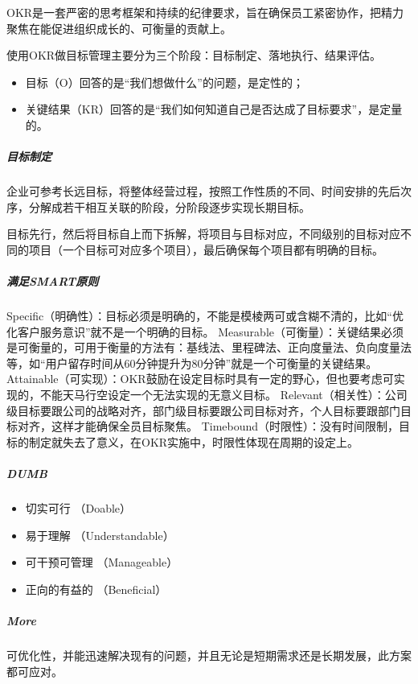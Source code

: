 \documentclass[letterpaper,10pt,english]{sphinxmanual}
\begin{document}
OKR是一套严密的思考框架和持续的纪律要求，旨在确保员工紧密协作，把精力聚焦在能促进组织成长的、可衡量的贡献上。

使用OKR做目标管理主要分为三个阶段：目标制定、落地执行、结果评估。
\begin{itemize}
\item {} 
目标（O）回答的是“我们想做什么”的问题，是定性的；

\item {} 
关键结果（KR）回答的是“我们如何知道自己是否达成了目标要求”，是定量的。

\end{itemize}


\subparagraph{目标制定}
\label{\detokenize{chapter_idea/goal:id1}}
企业可参考长远目标，将整体经营过程，按照工作性质的不同、时间安排的先后次序，分解成若干相互关联的阶段，分阶段逐步实现长期目标。

目标先行，然后将目标自上而下拆解，将项目与目标对应，不同级别的目标对应不同的项目（一个目标可对应多个项目），最后确保每个项目都有明确的目标。


\subparagraph{满足SMART原则}
\label{\detokenize{chapter_idea/goal:smart}}
Specific（明确性）：目标必须是明确的，不能是模棱两可或含糊不清的，比如“优化客户服务意识”就不是一个明确的目标。
Measurable（可衡量）：关键结果必须是可衡量的，可用于衡量的方法有：基线法、里程碑法、正向度量法、负向度量法等，如“用户留存时间从60分钟提升为80分钟”就是一个可衡量的关键结果。
Attainable（可实现）：OKR鼓励在设定目标时具有一定的野心，但也要考虑可实现的，不能天马行空设定一个无法实现的无意义目标。
Relevant（相关性）：公司级目标要跟公司的战略对齐，部门级目标要跟公司目标对齐，个人目标要跟部门目标对齐，这样才能确保全员目标聚焦。
Time\sphinxhyphen{}bound（时限性）：没有时间限制，目标的制定就失去了意义，在OKR实施中，时限性体现在周期的设定上。


\subparagraph{DUMB}
\label{\detokenize{chapter_idea/goal:dumb}}\begin{itemize}
\item {} 
切实可行 （Doable）

\item {} 
易于理解 （Understandable）

\item {} 
可干预可管理 （Manageable）

\item {} 
正向的有益的 （Beneficial）

\end{itemize}


\subparagraph{More}
\label{\detokenize{chapter_idea/goal:more}}
可优化性，并能迅速解决现有的问题，并且无论是短期需求还是长期发展，此方案都可应对。
\end{document}
